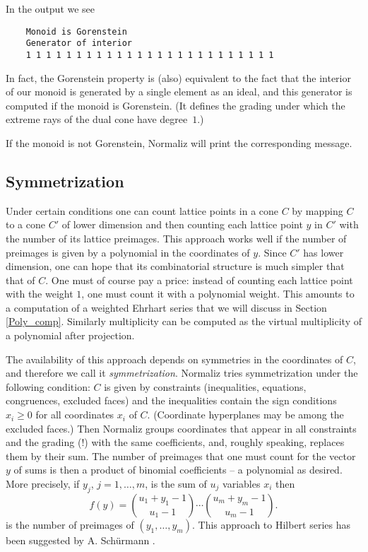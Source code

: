 \documentclass[12pt,a4paper]{scrartcl}
\theoremstyle{definition}
\begin{document}
{	In the output we see
	\begin{Verbatim}
	Monoid is Gorenstein 
	Generator of interior
	1 1 1 1 1 1 1 1 1 1 1 1 1 1 1 1 1 1 1 1 1 1 1 1 1 
	\end{Verbatim}
	
	In fact, the Gorenstein property is (also) equivalent to the fact that the interior of our monoid is generated by a single element as an ideal, and this generator is computed if the monoid is Gorenstein. (It defines the grading under which the extreme rays of the dual cone have degree~$1$.)
	
	If the monoid is not Gorenstein, Normaliz will print the corresponding message.
	
	\subsection{Symmetrization}\label{symmetrize}
	
	Under certain conditions one can count lattice points in a cone $C$  by mapping $C$ to a cone $C'$ of lower dimension and then counting each lattice point $y$ in $C'$ with the number of its lattice preimages. This approach works well if the number of preimages is given by a polynomial in the coordinates of $y$. Since $C'$ has lower dimension, one can hope that its combinatorial structure is much simpler that that of $C$. One must of course pay a price: instead of counting each lattice point with the weight $1$, one must count it with a polynomial weight. This amounts to a computation of a weighted Ehrhart series that we will discuss in Section \ref{Poly_comp}. Similarly multiplicity can be computed as the virtual multiplicity of a polynomial after projection.
	
	The availability of this approach depends on symmetries in the coordinates of $C$, and therefore we call it \emph{symmetrization}. Normaliz tries symmetrization under the following condition: $C$ is given by constraints (inequalities, equations, congruences, excluded faces) and the inequalities contain the sign conditions $x_i\ge 0$ for all coordinates  $x_i$ of $C$. (Coordinate hyperplanes may be among the excluded faces.) Then Normaliz groups coordinates that appear in all constraints and the grading (!) with the same coefficients, and, roughly speaking, replaces them by their sum. The number of preimages that one must count for the vector $y$  of sums is then a product of binomial coefficients -- a polynomial as desired. More precisely, if $y_j$, $j=1,\dots,m$, is the sum of  $u_j$ variables $x_i$ then
	$$
	f(y)=\binom{u_1+y_1-1}{u_1-1}\cdots \binom{u_m+y_m-1}{u_m-1}.
	$$
	is the number of preimages of $(y_1,\dots,y_m)$. This approach to Hilbert series has been suggested by A. Sch\"urmann \cite{Sch}.
	
}
\end{document}
